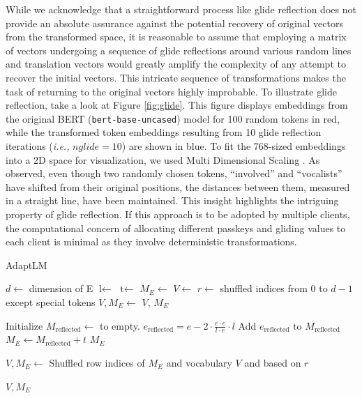 \documentclass[letterpaper]{article} %
\begin{document}
While we acknowledge that a straightforward process like glide reflection does not provide an absolute assurance against the potential recovery of original vectors from the transformed space, it is reasonable to assume that employing a matrix of vectors undergoing a sequence of glide reflections around various random lines and translation vectors would greatly amplify the complexity of any attempt to recover the initial vectors. This intricate sequence of transformations makes the task of returning to the original vectors highly improbable. To illustrate glide reflection, take a look at Figure \ref{fig:glide}. This figure displays embeddings from the original BERT (\texttt{bert-base-uncased}) model for 100 random tokens in red, while the transformed token embeddings resulting from 10 glide reflection iterations (\textit{i.e.,} $nglide = 10$) are shown in blue. To fit the 768-sized embeddings into a 2D space for visualization, we used Multi Dimensional Scaling \cite{kruskal1978multidimensional}. As observed, even though two randomly chosen tokens, ``involved'' and ``vocalists'' have shifted from their original positions, the distances between them, measured in a straight line, have been maintained. This insight highlights the intriguing property of glide reflection. If this approach is to be adopted by multiple clients, the computational concern of allocating different passkeys and gliding values to each client is minimal as they involve deterministic transformations.
\begin{algorithm}[t]
\caption{AdaptLM}
\label{alg:encrypt}
\begin{algorithmic}[1]
\footnotesize
{}
  \State $d \gets $ dimension of E
    \State $\text{l} \gets$ 
    \State $\text{t} \gets$ 
    \State $M_{E} \gets$ 
  \EndFor
    \State $V \gets$  
    \State $r \gets$ shuffled indices from 0 to $d-1$ except special tokens 
    \State $V, M_{E} \gets$ 
  \State \Return $V$, $M_{E}$
\EndFunction

    \State Initialize $M_{\text{reflected}} \gets$ to empty. 
        \State $e_{\text{reflected}} = e - 2 \cdot \frac{e \cdot e}{l \cdot e} \cdot l$
        \State Add $e_{\text{reflected}}$ to $M_{\text{reflected}}$
    \EndFor
    \State $M_E \gets M_{\text{reflected}} + t$
    \State \Return $M_E$
\EndFunction

  \State $V, M_{E} \gets$ Shuffled row indices of $M_{E}$ and vocabulary $V$ and based on $r$ 
  
  \State \Return $V, M_{E}$
\EndFunction
\end{algorithmic}
\end{algorithm}
\end{document}
